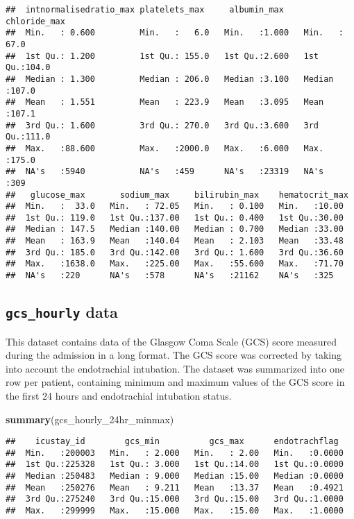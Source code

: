 \documentclass[
]{article}
\newenvironment{Shaded}{\begin{snugshade}}{\end{snugshade}}
\newcommand{\FunctionTok}[1]{\textcolor[rgb]{0.13,0.29,0.53}{\textbf{#1}}}
\newcommand{\NormalTok}[1]{#1}
\begin{document}
\begin{verbatim}
##  intnormalisedratio_max platelets_max     albumin_max     chloride_max  
##  Min.   : 0.600         Min.   :   6.0   Min.   :1.000   Min.   : 67.0  
##  1st Qu.: 1.200         1st Qu.: 155.0   1st Qu.:2.600   1st Qu.:104.0  
##  Median : 1.300         Median : 206.0   Median :3.100   Median :107.0  
##  Mean   : 1.551         Mean   : 223.9   Mean   :3.095   Mean   :107.1  
##  3rd Qu.: 1.600         3rd Qu.: 270.0   3rd Qu.:3.600   3rd Qu.:111.0  
##  Max.   :88.600         Max.   :2000.0   Max.   :6.000   Max.   :175.0  
##  NA's   :5940           NA's   :459      NA's   :23319   NA's   :309    
##   glucose_max       sodium_max     bilirubin_max    hematocrit_max 
##  Min.   :  33.0   Min.   : 72.05   Min.   : 0.100   Min.   :10.00  
##  1st Qu.: 119.0   1st Qu.:137.00   1st Qu.: 0.400   1st Qu.:30.00  
##  Median : 147.5   Median :140.00   Median : 0.700   Median :33.00  
##  Mean   : 163.9   Mean   :140.04   Mean   : 2.103   Mean   :33.48  
##  3rd Qu.: 185.0   3rd Qu.:142.00   3rd Qu.: 1.600   3rd Qu.:36.60  
##  Max.   :1638.0   Max.   :225.00   Max.   :55.600   Max.   :71.70  
##  NA's   :220      NA's   :578      NA's   :21162    NA's   :325
\end{verbatim}

\hypertarget{gcs_hourly-data}{%
\subsection{\texorpdfstring{\texttt{gcs\_hourly}
data}{gcs\_hourly data}}\label{gcs_hourly-data}}

This dataset contains data of the Glasgow Coma Scale (GCS) score
measured during the admission in a long format. The GCS score was
corrected by taking into account the endotrachial intubation. The
dataset was summarized into one row per patient, containing minimum and
maximum values of the GCS score in the first 24 hours and endotrachial
intubation status.

\begin{Shaded}
\begin{Highlighting}[]
\FunctionTok{summary}\NormalTok{(gcs\_hourly\_24hr\_minmax)}
\end{Highlighting}
\end{Shaded}

\begin{verbatim}
##    icustay_id        gcs_min          gcs_max      endotrachflag   
##  Min.   :200003   Min.   : 2.000   Min.   : 2.00   Min.   :0.0000  
##  1st Qu.:225328   1st Qu.: 3.000   1st Qu.:14.00   1st Qu.:0.0000  
##  Median :250483   Median : 9.000   Median :15.00   Median :0.0000  
##  Mean   :250276   Mean   : 9.211   Mean   :13.37   Mean   :0.4921  
##  3rd Qu.:275240   3rd Qu.:15.000   3rd Qu.:15.00   3rd Qu.:1.0000  
##  Max.   :299999   Max.   :15.000   Max.   :15.00   Max.   :1.0000
\end{verbatim}
\end{document}
